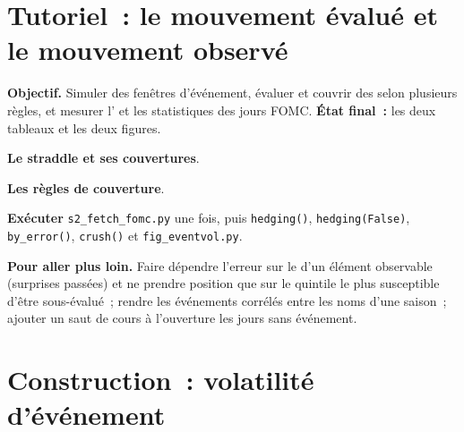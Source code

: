 \section{Tutoriel~: le mouvement évalué et le mouvement observé}\label{tut:s2:gamma-scalping-and-event-volatility:tut}

\begin{tutorial}
\textbf{Objectif.} Simuler des fenêtres d'événement, évaluer et couvrir des  selon plusieurs règles, et mesurer l' et les statistiques des jours FOMC.
\textbf{État final~:} les deux tableaux et les deux figures.
\begin{tutsteps}
\item \textbf{Le straddle et ses couvertures}.
\label{lst:s2:gamma-scalping-and-event-volatility:pnl}
\item \textbf{Les règles de couverture}.
\label{lst:s2:gamma-scalping-and-event-volatility:rules}
\item \textbf{Exécuter} \texttt{s2\_fetch\_fomc.py} une fois, puis \texttt{hedging()}, \texttt{hedging(False)}, \texttt{by\_error()}, \texttt{crush()} et
\texttt{fig\_eventvol.py}.
\end{tutsteps}
\textbf{Pour aller plus loin.} Faire dépendre l'erreur sur le  d'un élément observable (surprises passées) et ne prendre position que sur le quintile le plus susceptible
d'être sous-évalué~; rendre les événements corrélés entre les noms d'une saison~; ajouter un saut de cours à l'ouverture les jours sans événement.
\end{tutorial}

\section{Construction~: volatilité d'événement}\label{bld:s2:gamma-scalping-and-event-volatility:eventvol}

